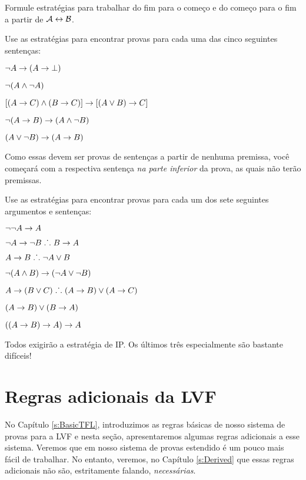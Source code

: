\problempart
Formule estratégias para trabalhar do fim para o começo e do começo para o fim a partir de $\mathcal{A} \leftrightarrow \mathcal{B}$.

\problempart
Use as estratégias para encontrar provas para cada uma das cinco seguintes sentenças:
\begin{earg}
\item $\neg A \rightarrow (A \rightarrow \bot)$
\item $\neg(A \wedge \neg A)$
\item $[(A \rightarrow C) \wedge (B \rightarrow C)] \rightarrow [(A \lor B) \rightarrow C]$
\item $\neg(A \rightarrow B) \rightarrow (A \wedge \neg B)$
\item $(A \vee \neg B) \rightarrow (A \rightarrow B)$
\end{earg}


Como essas devem ser provas de sentenças a partir de nenhuma premissa, você começará com a respectiva sentença \emph{na parte inferior} da prova, as quais não terão premissas.

\problempart
Use as estratégias para encontrar provas para cada um dos sete seguintes argumentos e sentenças:
\begin{earg}
\item $\neg\neg A \rightarrow A$
\item $\neg A \rightarrow \neg B \mathrel{\ldotp\dot{}\,\ldotp} B \rightarrow A$
\item $A \rightarrow B \mathrel{\ldotp\dot{}\,\ldotp} \neg A \vee B$
\item $\neg(A \wedge B) \rightarrow (\neg A \vee \neg B)$
\item $A \rightarrow (B \vee C) \mathrel{\ldotp\dot{}\,\ldotp} (A \rightarrow B) \vee (A \rightarrow C)$
\item $(A \rightarrow B) \lor (B \rightarrow A)$
\item $((A \rightarrow B) \rightarrow A) \rightarrow A$
\end{earg}
Todos exigirão a estratégia de IP. Os últimos três especialmente são bastante difíceis!


\chapter{Regras adicionais da LVF}\label{s:Further}
No Capítulo \ref{s:BasicTFL}, introduzimos as regras básicas de nosso sistema de provas para a LVF e nesta seção, apresentaremos algumas regras adicionais a esse sistema.  Veremos que em  nosso sistema de provas estendido é um pouco mais fácil de trabalhar.  No entanto, veremos, no Capítulo \ref{s:Derived} que essas regras adicionais não são, estritamente falando, \emph{necessárias}.

